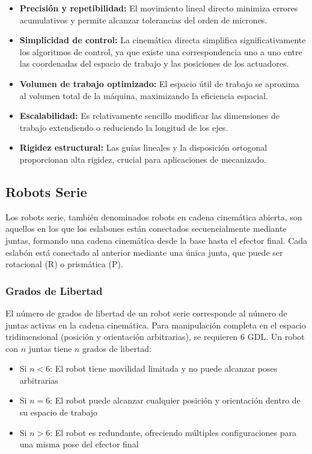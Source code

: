 \begin{itemize}
    \item \textbf{Precisión y repetibilidad:} El movimiento lineal directo minimiza errores acumulativos y permite alcanzar tolerancias del orden de micrones.
    
    \item \textbf{Simplicidad de control:} La cinemática directa simplifica significativamente los algoritmos de control, ya que existe una correspondencia uno a uno entre las coordenadas del espacio de trabajo y las posiciones de los actuadores.
    
    \item \textbf{Volumen de trabajo optimizado:} El espacio útil de trabajo se aproxima al volumen total de la máquina, maximizando la eficiencia espacial.
    
    \item \textbf{Escalabilidad:} Es relativamente sencillo modificar las dimensiones de trabajo extendiendo o reduciendo la longitud de los ejes.
    
    \item \textbf{Rigidez estructural:} Las guías lineales y la disposición ortogonal proporcionan alta rigidez, crucial para aplicaciones de mecanizado.
\end{itemize}

\subsection{Robots Serie}

Los robots serie, también denominados robots en cadena cinemática abierta, son aquellos en los que los eslabones están conectados secuencialmente mediante juntas, formando una cadena cinemática desde la base hasta el efector final. Cada eslabón está conectado al anterior mediante una única junta, que puede ser rotacional (R) o prismática (P).

\subsubsection{Grados de Libertad}

El número de grados de libertad de un robot serie corresponde al número de juntas activas en la cadena cinemática. Para manipulación completa en el espacio tridimensional (posición y orientación arbitrarias), se requieren 6 GDL. Un robot con $n$ juntas tiene $n$ grados de libertad:

\begin{itemize}
    \item Si $n < 6$: El robot tiene movilidad limitada y no puede alcanzar poses arbitrarias
    \item Si $n = 6$: El robot puede alcanzar cualquier posición y orientación dentro de su espacio de trabajo
    \item Si $n > 6$: El robot es redundante, ofreciendo múltiples configuraciones para una misma pose del efector final
\end{itemize}


